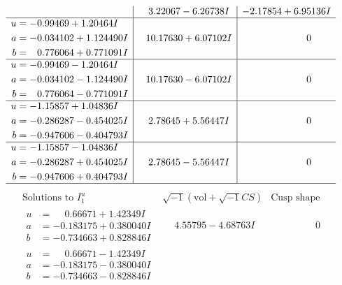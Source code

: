 \documentclass[1p]{elsarticle_modified}
\theoremstyle{definition}
\newcommand{\I}{\sqrt{-1}}
\begin{document}
$$\begin{array}{c|c|c}
 & \phantom{-}3.22067 - 6.26738 I & -2.17854 + 6.95136 I \\ \hline\begin{aligned}
u &= -0.99469 + 1.20464 I \\
a &= -0.034102 + 1.124490 I \\
b &= \phantom{-}0.776064 + 0.771091 I\end{aligned}
 & \phantom{-}10.17630 + 6.07102 I & \phantom{-0.000000 } 0 \\ \hline\begin{aligned}
u &= -0.99469 - 1.20464 I \\
a &= -0.034102 - 1.124490 I \\
b &= \phantom{-}0.776064 - 0.771091 I\end{aligned}
 & \phantom{-}10.17630 - 6.07102 I & \phantom{-0.000000 } 0 \\ \hline\begin{aligned}
u &= -1.15857 + 1.04836 I \\
a &= -0.286287 - 0.454025 I \\
b &= -0.947606 - 0.404793 I\end{aligned}
 & \phantom{-}2.78645 + 5.56447 I & \phantom{-0.000000 } 0 \\ \hline\begin{aligned}
u &= -1.15857 - 1.04836 I \\
a &= -0.286287 + 0.454025 I \\
b &= -0.947606 + 0.404793 I\end{aligned}
 & \phantom{-}2.78645 - 5.56447 I & \phantom{-0.000000 } 0\\
 \hline 
 \end{array}$$\newpage$$\begin{array}{c|c|c}  
\text{Solutions to }I^u_{1}& \I (\text{vol} + \sqrt{-1}CS) & \text{Cusp shape}\\
 \hline 
\begin{aligned}
u &= \phantom{-}0.66671 + 1.42349 I \\
a &= -0.183175 + 0.380040 I \\
b &= -0.734663 + 0.828846 I\end{aligned}
 & \phantom{-}4.55795 - 4.68763 I & \phantom{-0.000000 } 0 \\ \hline\begin{aligned}
u &= \phantom{-}0.66671 - 1.42349 I \\
a &= -0.183175 - 0.380040 I \\
b &= -0.734663 - 0.828846 I\end{aligned}

\end{array}$$
\end{document}
